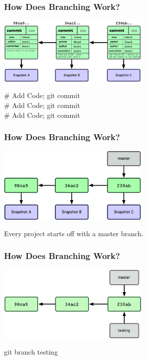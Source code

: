 \begin{frame}
\frametitle{\large How Does Branching Work?}
\begin{center}
\includegraphics[width=0.55\textwidth]{img/branching_images/fig2.png}
\end{center}
\vspace{2mm}
\begin{center}
\# Add Code; git commit \\
\# Add Code; git commit \\
\# Add Code; git commit
\end{center}
\end{frame}

\begin{frame}
\frametitle{\large How Does Branching Work?}
\begin{center}
\includegraphics[width=0.55\textwidth]{img/branching_images/fig3.png}
\end{center}
\vspace{2mm}
\begin{center}
Every project starts off with a master branch.
\end{center}
\end{frame}

\begin{frame}
\frametitle{\large How Does Branching Work?}
\begin{center}
\includegraphics[width=0.55\textwidth]{img/branching_images/fig4.png}
\end{center}
\vspace{2mm}
\begin{center}
git branch testing
\end{center}
\end{frame}

